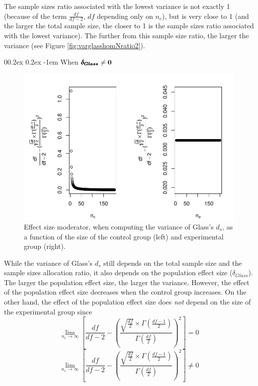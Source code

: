 \documentclass[
  english,
  man]{apa6}
\makeatletter
\let\oldparagraph\paragraph
\renewcommand{\paragraph}[1]{\oldparagraph{#1}\mbox{}}
\renewcommand{\paragraph}{\@startsection{paragraph}{4}{\parindent}%
  {0\baselineskip \@plus 0.2ex \@minus 0.2ex}%
  {-1em}%
  {\normalfont\normalsize\bfseries\itshape\typesectitle}}
\makeatother
\begin{document}
The sample sizes ratio associated with the lowest variance is not exactly 1 (because of the term \(\frac{df}{df-2}\), \(df\) depending only on \(n_c\)), but is very close to 1 (and the larger the total sample size, the closer to 1 is the sample sizes ratio associated with the lowest variance). The further from this sample size ratio, the larger the variance (see Figure \ref{fig:varglasshomNratio2}).

\hypertarget{when-bf-pmbdelta_glass-neq-0}{%
\paragraph{\texorpdfstring{When \(\bf \pmb{\delta_{Glass}} \neq 0\)}{When \textbackslash bf \textbackslash pmb\{\textbackslash delta\_\{Glass\}\} \textbackslash neq 0}}\label{when-bf-pmbdelta_glass-neq-0}}

\begin{figure}
\centering
\includegraphics{Theoretical-Variance-of-all-estimators-as-a-function-of-population-parameters_files/figure-latex/ESmoderatorGlassNsize2-1.pdf}
\caption{\label{fig:ESmoderatorGlassNsize2}Effect size moderator, when computing the variance of Glass's \(d_s\), as a function of the size of the control group (left) and experimental group (right).}
\end{figure}

While the variance of Glass's \(d_s\) still depends on the total sample size and the sample sizes allocation ratio, it also depends on the population effect size (\(\delta_{Glass}\)). The larger the population effect size, the larger the variance. However, the effect of the population effect size decreases when the control group increases. On the other hand, the effect of the population effect size does \emph{not} depend on the size of the experimental group since\\
\[\lim_{n_c\rightarrow \infty}\left[\frac{df}{df-2} - \left( \frac{\sqrt{\frac{df}{2}} \times \Gamma \left(\frac{df-1}{2} \right)}{\Gamma \left( \frac{df}{2}\right)}\right)^2 \right]=0\]
\[\lim_{n_e\rightarrow \infty}\left[\frac{df}{df-2} - \left( \frac{\sqrt{\frac{df}{2}} \times \Gamma \left(\frac{df-1}{2} \right)}{\Gamma \left( \frac{df}{2}\right)}\right)^2 \right] \neq 0\]
\end{document}
